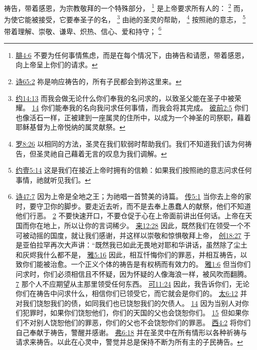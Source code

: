 \documentclass[12pt, a4paper, oneside]{ctexart}
\newcounter{parnum}[section]
\newcommand{\N}{%
   \noindent\refstepcounter{parnum}%
    \makebox[\parindent][l]{\textbf{\arabic{parnum}.}}}
\begin{document}
\N 祷告，带着感恩，为宗教敬拜的一个特殊部分，
	\footnote {
		\href{https://biblehub.com/philippians/4-6.htm}{腓4:6} 不要为任何事情焦虑，而是在每个情况下，由祷告和请愿，带着感恩，向上帝呈上你们的请求。
	}
	是上帝要求所有人的：
	\footnote {
		\href{https://biblehub.com/psalms/65-2.htm}{诗65:2} 祢是响应祷告的，所有子民都会到祢这里来。
	}
	而，为使它能被接受，它要奉圣子的名，
	\footnote {
		\href{https://biblehub.com/john/14-13.htm}{约14:13} 而我会做无论什么你们奉我的名问求的，以致圣父能在圣子中被荣耀。
		\href{https://biblehub.com/john/14-14.htm}{14} 你们能奉我的名向我问求任何事情，而我会将其完成。
		\href{https://biblehub.com/1_peter/2-5.htm}{彼前2:5} 你们也像活石一样，正被建到一座属灵的住所中，以成为一个神圣的司祭职，藉着耶稣基督为上帝悦纳的属灵献祭。
	}
	由祂的圣灵的帮助，
	\footnote {
		\href{https://biblehub.com/romans/8-26.htm}{罗8:26} 以相同的方法，圣灵在我们软弱时帮助我们。我们不知道我们该为何祷告，但圣灵祂自己藉着无言的叹息为我们调解。
	}
	按照祂的意志，
	\footnote {
		\href{https://biblehub.com/1_john/5-14.htm}{约壹5:14} 这是我们在接近上帝时拥有的信赖：如果我们按照祂的意志问求任何事情，祂就听见我们。
	}
	带着理解、崇敬、谦卑、炽热、信心、爱和持守；
	\footnote {
		\href{https://biblehub.com/psalms/47-7.htm}{诗47:7} 因为上帝是全地之王；为祂唱一首赞美的诗篇。
		\href{https://biblehub.com/ecclesiastes/5-1.htm}{传5:1} 当你去上帝的家时，要守卫你的脚步。要走近去听，而不是去奉上愚蠢人的献祭，他们不知道他们行恶。
		\href{https://biblehub.com/ecclesiastes/5-2.htm}{2} 不要快速开口，不要仓促于心在上帝面前讲出任何话。上帝在天国而你在地上，所以让你的言词稀少。
		\href{https://biblehub.com/hebrews/12-28.htm}{来12:28} 因此，既然我们在领受一个不可被动摇的国度，就让我们感谢，并这样以崇敬和惊惧敬拜上帝，
		\href{https://biblehub.com/genesis/18-27.htm}{创18:27} 于是亚伯拉罕再次大声讲：“既然我已如此无畏地对耶和华讲话，虽然除了尘土和灰烬我什么都不是，
		\href{https://biblehub.com/james/5-16.htm}{雅5:16} 因此，相互忏悔你们的罪恶，并相互祷告，以致你们能被治愈。一个正义个体的祷告是有权柄而有效力的。
		\href{https://biblehub.com/james/1-6.htm}{雅1:6} 但当你们问求时，你们必须相信且不怀疑，因为怀疑的人像海浪一样，被风吹而翻腾。
		\href{https://biblehub.com/james/1-7.htm}{7} 那个人不应期望从主那里领受任何东西。
		\href{https://biblehub.com/mark/11-24.htm}{可11:24} 因此，我告诉你们，无论你们在祷告中问求什么，相信你们已领受它，而它就会是你们的。
		\href{https://biblehub.com/matthew/6-12.htm}{太6:12} 并对我们饶恕我们的债，如同我们也已饶恕我们的欠债人。
		\href{https://biblehub.com/matthew/6-14.htm}{14} 因为当别人对你们犯罪时，如果你们饶恕他们，你们的天国的父也会饶恕你们。
		\href{https://biblehub.com/matthew/6-15.htm}{15} 但如果你们不对别人饶恕他们的罪恶，你们的父也不会饶恕你们的罪恶。
		\href{https://biblehub.com/colossians/4-2.htm}{西4:2} 将你们自己奉献于祷告，警醒并感谢。
		\href{https://biblehub.com/ephesians/6-18.htm}{弗6:18} 并在圣灵中在所有情形以各种祈祷与请求来祷告。以此在心灵中，警觉并总是保持不断为所有主的子民祷告。
	}
\end{document}
